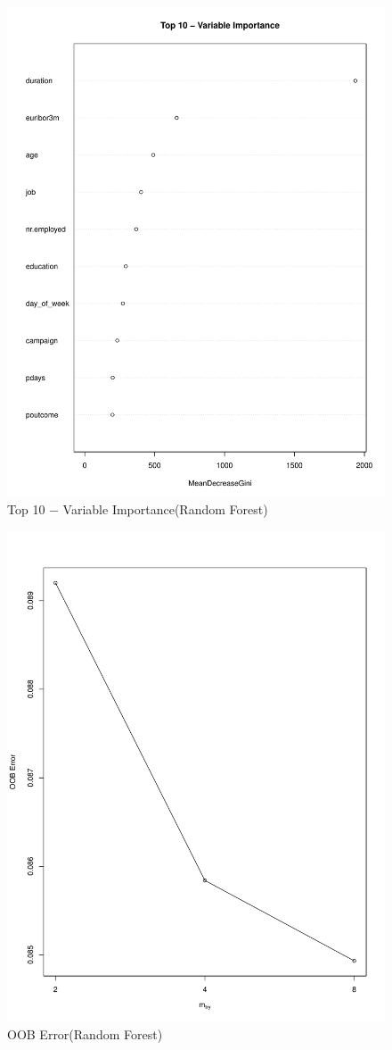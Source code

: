 \documentclass[12pt, a4paper, bibliography=totoc, english]{scrartcl}
\begin{document}
\begin{figure}
	\centering
	\includegraphics[width=0.7\linewidth]{RF2}
	\caption{Top 10 − Variable Importance(Random Forest)}
	\label{fig:rf2}
\end{figure}

\begin{figure}
	\centering
	\includegraphics[width=0.7\linewidth]{RF3}
	\caption{OOB Error(Random Forest)}
	\label{fig:rf3}
\end{figure}
\end{document}
